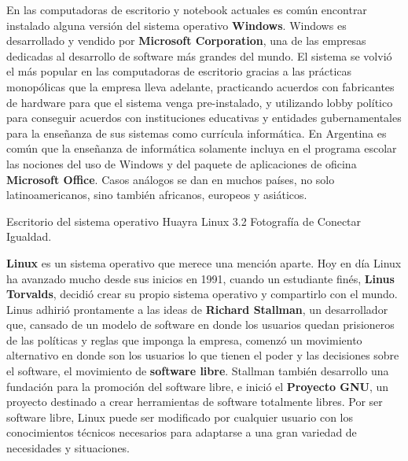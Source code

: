 En las computadoras de escritorio y notebook actuales es común encontrar
instalado alguna versión del sistema operativo \textbf{Windows}. Windows es
desarrollado y vendido por \textbf{Microsoft Corporation}, una de las empresas
dedicadas al desarrollo de software más grandes del mundo. El sistema se volvió
el más popular en las computadoras de escritorio gracias a las prácticas
monopólicas que la empresa lleva adelante, practicando acuerdos con fabricantes
de hardware para que el sistema venga pre-instalado, y utilizando lobby político
para conseguir acuerdos con instituciones educativas y entidades gubernamentales
para la enseñanza de sus sistemas como currícula informática. En Argentina es
común que la enseñanza de informática solamente incluya en el programa escolar
las nociones del uso de Windows y del paquete de aplicaciones de oficina
\textbf{Microsoft Office}. Casos análogos se dan en muchos países, no solo
latinoamericanos, sino también africanos, europeos y
asiáticos.\autocite{lenard_1999}

{Escritorio del sistema operativo Huayra Linux 3.2} {Fotografía de Conectar
Igualdad.}

\textbf{Linux} es un sistema operativo que merece una mención aparte. Hoy en día
Linux ha avanzado mucho desde sus inicios en 1991, cuando un estudiante finés,
\textbf{Linus Torvalds}, decidió crear su propio sistema operativo y compartirlo
con el mundo. Linus adhirió prontamente a las ideas de \textbf{Richard
Stallman}, un desarrollador que, cansado de un modelo de software en donde los
usuarios quedan prisioneros de las políticas y reglas que imponga la empresa,
comenzó un movimiento alternativo en donde son los usuarios lo que tienen el
poder y las decisiones sobre el software, el movimiento de \textbf{software
libre}. Stallman también desarrollo una fundación para la promoción del software
libre, e inició el \textbf{Proyecto GNU}, un proyecto destinado a crear
herramientas de software totalmente libres. Por ser software libre, Linux puede
ser modificado por cualquier usuario con los conocimientos técnicos necesarios
para adaptarse a una gran variedad de necesidades y situaciones.

